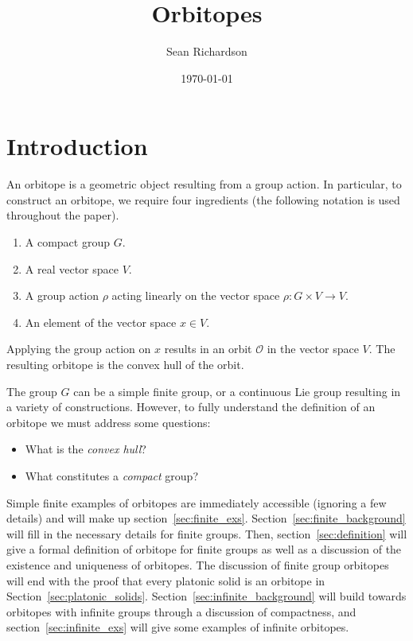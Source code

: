 \documentclass[12]{amsart}
\newcommand{\orb}[0]{\mathcal{O}}
\begin{document}
\title{Orbitopes}
\author{Sean Richardson}
\date{\today}
\maketitle

\section{Introduction}

An orbitope is a geometric object resulting from a group action. In particular, to construct an orbitope, we require four ingredients (the following notation is used throughout the paper).
\begin{enumerate}
    \item A compact group $G$.
    \item A real vector space $V$.
    \item A group action $\rho$ acting linearly on the vector space $\rho: G \times V \to V$.
    \item An element of the vector space $x \in V$.
\end{enumerate}
 Applying the group action on $x$ results in an orbit $\orb$ in the vector space $V$. The resulting orbitope is the convex hull of the orbit.

The group $G$ can be a simple finite group, or a continuous Lie group resulting in a variety of constructions. However, to fully understand the definition of an orbitope we must address some questions:
 \begin{itemize}
    \item What is the \emph{convex hull}?
    \item What constitutes a \emph{compact} group?
 \end{itemize}
Simple finite examples of orbitopes are immediately accessible (ignoring a few details) and will make up section~\ref{sec:finite_exs}. Section~\ref{sec:finite_background} will fill in the necessary details for finite groups. Then, section~\ref{sec:definition} will give a formal definition of orbitope for finite groups as well as a discussion of the existence and uniqueness of orbitopes. The discussion of finite group orbitopes will end with the proof that every platonic solid is an orbitope in Section~\ref{sec:platonic_solids}. Section~\ref{sec:infinite_background} will build towards orbitopes with infinite groups through a discussion of compactness, and section~\ref{sec:infinite_exs} will give some examples of infinite orbitopes.
\end{document}
